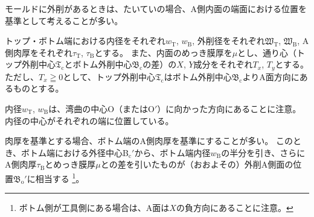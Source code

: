モールドに外削があるときは、たいていの場合、A側内面の端面における位置を基準として考えることが多い。

トップ・ボトム端における内径をそれぞれ$w_\mathrm T$, $w_\mathrm B$, 外削径をそれぞれ$\mathfrak W_\mathrm T$, $\mathfrak W_\mathrm B$, A側肉厚をそれぞれ$\tau_\mathrm T$, $\tau_\mathrm B$とする。
また、内面のめっき膜厚を$\mu$とし、通り心（トップ外削中心$\mathfrak T_\mathrm c$とボトム外削中心$\mathfrak B_\mathrm c$の差）の$X$, $Y$成分をそれぞれ$T_x$, $T_y$とする。
ただし、$T_x \geqq 0$として、トップ外削中心$\mathfrak T_\mathrm c$はボトム外削中心$\mathfrak B_\mathrm c$よりA面方向にあるものとする。
\begin{hosoku}
内径$w_\mathrm T$, $w_\mathrm B$は、湾曲の中心O（またはO$'$）に向かった方向にあることに注意。
内径の中心がそれぞれの端に位置している。
\end{hosoku}



肉厚を基準とする場合、ボトム端のA側肉厚を基準にすることが多い。
このとき、ボトム端における外径中心B$_\mathrm c'$から、ボトム端内径$w_\mathrm B$の半分を引き、さらにA側肉厚$\tau_\mathrm B$とめっき膜厚$\mu$との差を引いたものが（おおよその）外削A側面の位置$\mathfrak B_\mathrm o'$に相当する
\footnote{ボトム側が工具側にある場合は、A面は$X$の負方向にあることに注意。}。


